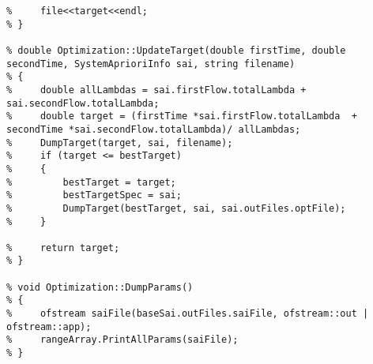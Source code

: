 \begin{lstlisting}[language={[ISO]C++}]
%     sai.PrintOpt(file);
%     file<<target<<endl;
% }

% double Optimization::UpdateTarget(double firstTime, double secondTime, SystemAprioriInfo sai, string filename)
% {
%     double allLambdas = sai.firstFlow.totalLambda + sai.secondFlow.totalLambda;
%     double target = (firstTime *sai.firstFlow.totalLambda  + secondTime *sai.secondFlow.totalLambda)/ allLambdas;
%     DumpTarget(target, sai, filename);
%     if (target <= bestTarget)
%     {
%         bestTarget = target;
%         bestTargetSpec = sai;
%         DumpTarget(bestTarget, sai, sai.outFiles.optFile);
%     }

%     return target;
% }

% void Optimization::DumpParams()
% {
%     ofstream saiFile(baseSai.outFiles.saiFile, ofstream::out | ofstream::app);
%     rangeArray.PrintAllParams(saiFile);
% }
\end{lstlisting}

